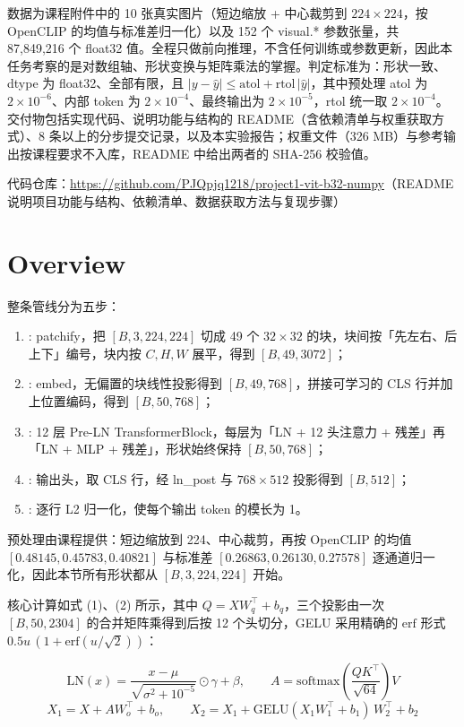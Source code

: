 \documentclass[a4paper,12pt]{article}
\begin{document}
数据为课程附件中的 10 张真实图片（短边缩放 + 中心裁剪到 $224\times224$，按 OpenCLIP 的均值与标准差归一化）以及 152 个 visual.* 参数张量，共 87{,}849{,}216 个 float32 值。全程只做前向推理，不含任何训练或参数更新，因此本任务考察的是对数组轴、形状变换与矩阵乘法的掌握。判定标准为：形状一致、dtype 为 float32、全部有限，且 $|y-\hat{y}|\le \mathrm{atol}+\mathrm{rtol}\,|\hat{y}|$，其中预处理 atol 为 $2\times10^{-6}$、内部 token 为 $2\times10^{-4}$、最终输出为 $2\times10^{-5}$，rtol 统一取 $2\times10^{-4}$。交付物包括实现代码、说明功能与结构的 README（含依赖清单与权重获取方式）、8 条以上的分步提交记录，以及本实验报告；权重文件（326 MB）与参考输出按课程要求不入库，README 中给出两者的 SHA-256 校验值。

\noindent 代码仓库：\url{https://github.com/PJQpjq1218/project1-vit-b32-numpy}（README 说明项目功能与结构、依赖清单、数据获取方法与复现步骤）


\section{Overview}
整条管线分为五步：

\begin{enumerate}
    \item[Step 1]: patchify，把 $[B,3,224,224]$ 切成 49 个 $32\times32$ 的块，块间按「先左右、后上下」编号，块内按 $C,H,W$ 展平，得到 $[B,49,3072]$；
    \item[Step 2]: embed，无偏置的块线性投影得到 $[B,49,768]$，拼接可学习的 CLS 行并加上位置编码，得到 $[B,50,768]$；
    \item[Step 3]: 12 层 Pre-LN TransformerBlock，每层为「LN + 12 头注意力 + 残差」再「LN + MLP + 残差」，形状始终保持 $[B,50,768]$；
    \item[Step 4]: 输出头，取 CLS 行，经 ln\_post 与 $768\times512$ 投影得到 $[B,512]$；
    \item[Step 5]: 逐行 L2 归一化，使每个输出 token 的模长为 1。
\end{enumerate}

预处理由课程提供：短边缩放到 224、中心裁剪，再按 OpenCLIP 的均值 $[0.48145,0.45783,0.40821]$ 与标准差 $[0.26863,0.26130,0.27578]$ 逐通道归一化，因此本节所有形状都从 $[B,3,224,224]$ 开始。

核心计算如式 (1)、(2) 所示，其中 $Q=XW_q^{\top}+b_q$，三个投影由一次 $[B,50,2304]$ 的合并矩阵乘得到后按 12 个头切分，GELU 采用精确的 $\mathrm{erf}$ 形式 $0.5u\,(1+\mathrm{erf}(u/\sqrt{2}))$：

\begin{equation}
\mathrm{LN}(x)=\frac{x-\mu}{\sqrt{\sigma^2+10^{-5}}}\odot\gamma+\beta,
\qquad
A=\mathrm{softmax}\!\left(\frac{QK^{\top}}{\sqrt{64}}\right)V
\end{equation}
\begin{equation}
X_1=X+AW_o^{\top}+b_o,
\qquad
X_2=X_1+\mathrm{GELU}(X_1W_1^{\top}+b_1)\,W_2^{\top}+b_2
\end{equation}
\end{document}
